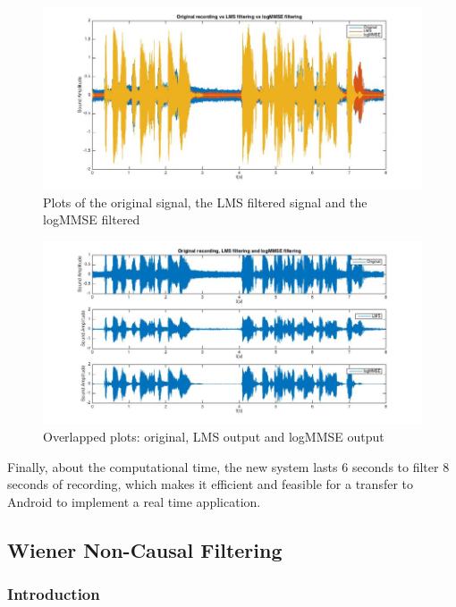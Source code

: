 \documentclass[11pt,a4paper,english]{book}  %
\theoremstyle{definition}  %
\theoremstyle{plain}  %
\theoremstyle{remark}  %
\begin{document}
		\begin{figure}[h]
		\centering
		\includegraphics[width=15cm]{images/theory/logmmse2.jpg}
		\caption{Plots of the original signal, the LMS filtered signal and the logMMSE filtered}
		\label{fig:logmmse1}
		\end{figure}
		
		
		\begin{figure}[h]
		\centering
		\includegraphics[width=15cm]{images/theory/logmmse3.jpg}
		\caption{Overlapped plots: original, LMS output and logMMSE output}
		\label{fig:logmmse2}
		\end{figure}


Finally, about the computational time, the new system lasts 6 seconds to filter 8 seconds of recording, which makes it efficient and feasible for a transfer to Android to implement a real time application.

	\subsection{Wiener Non-Causal Filtering}
	
	\subsubsection{Introduction}
	
\end{document}
